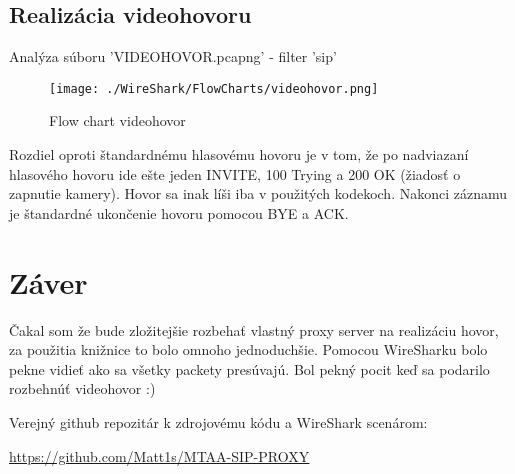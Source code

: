 \documentclass[10pt,oneside,slovak,a4paper]{article}
\begin{document}
\newpage

\subsection{Realizácia videohovoru}
Analýza súboru 'VIDEOHOVOR.pcapng' - filter 'sip'
\begin{figure}[h]
\centerline{\texttt{[image: ./WireShark/FlowCharts/videohovor.png]}} 
\caption{Flow chart videohovor}
\end{figure}

Rozdiel oproti štandardnému hlasovému hovoru je v tom, že po nadviazaní hlasového hovoru ide ešte jeden INVITE, 100 Trying a 200 OK (žiadosť o zapnutie kamery).
Hovor sa inak líši iba v použitých kodekoch. Nakonci záznamu je štandardné ukončenie hovoru pomocou BYE a ACK.

\section{Záver}
Čakal som že bude zložitejšie rozbehať vlastný proxy server na realizáciu hovor, za použitia knižnice to bolo omnoho jednoduchšie.
Pomocou WireSharku bolo pekne vidieť ako sa všetky packety presúvajú. Bol pekný pocit keď sa podarilo rozbehnúť videohovor :)

\medskip
Verejný github repozitár k zdrojovému kódu a WireShark scenárom:

\href{https://github.com/Matt1s/MTAA-SIP-PROXY}{\underline{https://github.com/Matt1s/MTAA-SIP-PROXY}}
\end{document}
